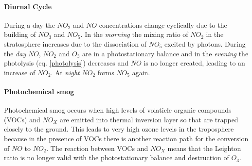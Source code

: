 \documentclass[12pt, english]{scrartcl} %
\begin{document}
\begin{multicols}{2}
\paragraph{Diurnal Cycle}
During a day the $NO_2$ and $NO$ concentrations change cyclically due to the building of $NO_3$ and $NO_5$. In the \textit{morning} the mixing ratio of $NO_2$ in the stratosphere increases due to the dissociation of $NO_5$ excited by photons. During the \textit{day} $NO$, $NO_2$ and $O_3$ are in a photostationary balance and in the \textit{evening} the photolysis (eq. \ref{photolysis}) decreases and $NO$ is no longer created, leading to an increase of $NO_2$. At \textit{night} $NO_2$ forms $NO_5$ again.
\paragraph{Photochemical smog}
Photochemical smog occurs when high levels of volaticle organic compounds (VOCs) and $NO_X$ are emitted into thermal inversion layer so that are trapped closely to the ground. This leads to very high ozone levels in the troposphere because in the presence of VOCs there is another reaction path for the conversion of $NO$ to $NO_2$. The reaction between VOCs and $NO_X$ means that the Leighton ratio is no longer valid with the photostationary balance and destruction of $O_3$. 

\end{multicols}
\end{document}
